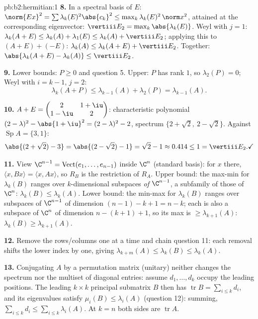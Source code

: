 \begin{solution}{pb:b2:hermitian:1}
\textbf{8.} In a spectral basis of $E$: $\norm{Ex}^2 = \sum
\lambda_k(E)^2\abs{c_k}^2 \leq \max_k\lambda_k(E)^2\,\norm
x^2$, attained at the corresponding eigenvector: $\vertiii E_2
= \max_k\abs{\lambda_k(E)}$. Weyl with $j = 1$: $\lambda_k(A+E)
\leq \lambda_k(A) + \lambda_1(E) \leq \lambda_k(A) + \vertiii
E_2$; applying this to $(A+E) + (-E)$: $\lambda_k(A) \leq
\lambda_k(A+E) + \vertiii E_2$. Together:
$\abs{\lambda_k(A+E) - \lambda_k(A)} \leq \vertiii E_2$.

\textbf{9.} Lower bounds: $P \geq 0$ and question 5. Upper: $P$
has rank $1$, so $\lambda_2(P) = 0$; Weyl with $i = k-1$, $j =
2$:
\[
\lambda_k(A + P) \leq \lambda_{k-1}(A) + \lambda_2(P)
= \lambda_{k-1}(A) .
\]

\textbf{10.} $A + E = \begin{pmatrix} 2 & 1+\iu\\ 1-\iu &
2\end{pmatrix}$: characteristic polynomial $(2-\lambda)^2 -
\abs{1+\iu}^2 = (2-\lambda)^2 - 2$, spectrum $\{2 + \sqrt2,\ 2
- \sqrt2\}$. Against $\operatorname{Sp}A = \{3, 1\}$:
\[
\abs{(2+\sqrt2) - 3} = \abs{(2-\sqrt2) - 1} = \sqrt2 - 1
\approx 0.414 \leq 1 = \vertiii E_2 . \checkmark
\]

\textbf{11.} View $\C^{n-1} = \operatorname{Vect}(e_1, \dots,
e_{n-1})$ inside $\C^n$ (standard basis): for $x$ there,
$\langle x, Bx\rangle = \langle x, Ax\rangle$, so $R_B$ is the
restriction of $R_A$. Upper bound: the max-min for $\lambda_k
(B)$ ranges over $k$-dimensional subspaces \emph{of}
$\C^{n-1}$, a subfamily of those of $\C^n$: $\lambda_k(B) \leq
\lambda_k(A)$. Lower bound: the min-max for $\lambda_k(B)$
ranges over subspaces of $\C^{n-1}$ of dimension $(n-1)-k+1 =
n-k$; each is also a subspace of $\C^n$ of dimension $n -
(k+1) + 1$, so its max is $\geq \lambda_{k+1}(A)$:
$\lambda_k(B) \geq \lambda_{k+1}(A)$.

\textbf{12.} Remove the rows/columns one at a time and chain
question 11: each removal shifts the lower index by one, giving
$\lambda_{k+m}(A) \leq \lambda_k(B) \leq \lambda_k(A)$.

\textbf{13.} Conjugating $A$ by a permutation matrix (unitary)
neither changes the spectrum nor the multiset of diagonal
entries: assume $d_1, \dots, d_k$ occupy the leading positions.
The leading $k\times k$ principal submatrix $B$ then has
$\operatorname{tr} B = \sum_{i\leq k}d_i$, and its eigenvalues
satisfy $\mu_i(B) \leq \lambda_i(A)$ (question 12): summing,
$\sum_{i\leq k}d_i \leq \sum_{i\leq k}\lambda_i(A)$. At $k =
n$ both sides are $\operatorname{tr} A$.


\end{solution}
